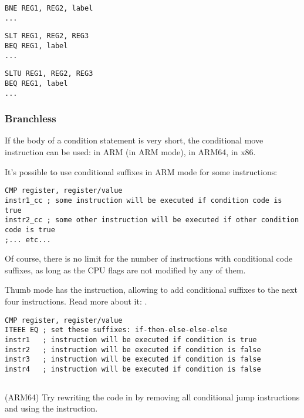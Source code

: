 \begin{lstlisting}[caption=Check for non-equal values,style=customasmMIPS]
BNE REG1, REG2, label
...
\end{lstlisting}

\begin{lstlisting}[caption=Check for less than (signed),style=customasmMIPS]
SLT REG1, REG2, REG3
BEQ REG1, label
...
\end{lstlisting}

\begin{lstlisting}[caption=Check for less than (unsigned),style=customasmMIPS]
SLTU REG1, REG2, REG3
BEQ REG1, label
...
\end{lstlisting}

\subsubsection{Branchless}

If the body of a condition statement is very short, the conditional move instruction can be used: 
 in ARM (in ARM mode),  in ARM64,  in x86.


It's possible to use conditional suffixes in ARM mode for some instructions:

\begin{lstlisting}[caption=ARM (\ARMMode),style=customasmARM]
CMP register, register/value
instr1_cc ; some instruction will be executed if condition code is true
instr2_cc ; some other instruction will be executed if other condition code is true
;... etc...
\end{lstlisting}

Of course, there is no limit for the number of instructions with conditional code suffixes, 
as long as the CPU flags are not modified by any of them.


Thumb mode has the  instruction, allowing to add conditional suffixes to the next four instructions.
Read more about it: .

\begin{lstlisting}[caption=ARM (\ThumbMode),style=customasmARM]
CMP register, register/value
ITEEE EQ ; set these suffixes: if-then-else-else-else
instr1   ; instruction will be executed if condition is true
instr2   ; instruction will be executed if condition is false
instr3   ; instruction will be executed if condition is false
instr4   ; instruction will be executed if condition is false
\end{lstlisting}

\subsection{\Exercise}

(ARM64) Try rewriting the code in  by removing all 
conditional jump instructions and using the  instruction.

